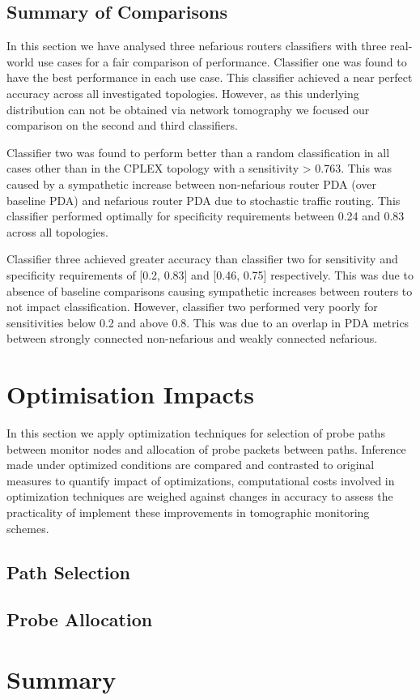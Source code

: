 \subsection{Summary of Comparisons}
\label{ssec:Rnefidsummary}
In this section we have analysed three nefarious routers classifiers with three real-world use cases for a fair comparison of performance. Classifier one was found to have the best performance in each use case. This classifier achieved a near perfect accuracy across all investigated topologies. However, as this underlying distribution can not be obtained via network tomography we focused our comparison on the second and third classifiers.\par
Classifier two was found to perform better than a random classification in all cases other than in the CPLEX topology with a sensitivity > 0.763. This was caused by a sympathetic increase between non-nefarious router PDA (over baseline PDA) and nefarious router PDA due to stochastic traffic routing. This classifier performed optimally for specificity requirements between 0.24 and 0.83 across all topologies.\par
Classifier three achieved greater accuracy than classifier two for sensitivity and specificity requirements of [0.2, 0.83] and [0.46, 0.75] respectively. This was due to absence of baseline comparisons causing sympathetic increases between routers to not impact classification. However, classifier two performed very poorly for sensitivities below 0.2 and above 0.8. This was due to an overlap in PDA metrics between strongly connected non-nefarious and weakly connected nefarious.

\section{Optimisation Impacts}
\label{sec:Rprobingoptimality}
In this section we apply optimization techniques for selection of probe paths between monitor nodes and allocation of probe packets between paths. Inference made under optimized conditions are compared and contrasted to original measures to quantify impact of optimizations, computational costs involved in optimization techniques are weighed against changes in accuracy to assess the practicality of implement these improvements in tomographic monitoring schemes.

\subsection{Path Selection}
\label{ssec:Rpathselection}


\subsection{Probe Allocation}
\label{ssec:Rprobeallocation}

\section{Summary}

